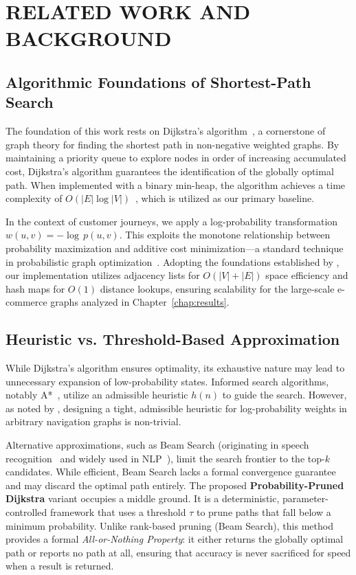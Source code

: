 \chapter{RELATED WORK AND BACKGROUND}

\section{Algorithmic Foundations of Shortest-Path Search}

The foundation of this work rests on Dijkstra's algorithm~\citep{dijkstra1959}, a cornerstone of graph theory for finding the shortest path in non-negative weighted graphs. By maintaining a priority queue to explore nodes in order of increasing accumulated cost, Dijkstra's algorithm guarantees the identification of the globally optimal path. When implemented with a binary min-heap, the algorithm achieves a time complexity of $O(|E|\log|V|)$~\citep{cormen2009}, which is utilized as our primary baseline.

In the context of customer journeys, we apply a log-probability transformation $w(u,v) = -\log\,p(u,v)$. This exploits the monotone relationship between probability maximization and additive cost minimization---a standard technique in probabilistic graph optimization~\citep{manning1999nlp}. Adopting the foundations established by \citet{cormen2009}, our implementation utilizes adjacency lists for $O(|V|+|E|)$ space efficiency and hash maps for $O(1)$ distance lookups, ensuring scalability for the large-scale e-commerce graphs analyzed in Chapter~\ref{chap:results}.

\section{Heuristic vs. Threshold-Based Approximation}

While Dijkstra's algorithm ensures optimality, its exhaustive nature may lead to unnecessary expansion of low-probability states. Informed search algorithms, notably A*~\citep{hart1968astar}, utilize an admissible heuristic $h(n)$ to guide the search. However, as noted by \citet{pearl1984heuristics}, designing a tight, admissible heuristic for log-probability weights in arbitrary navigation graphs is non-trivial.

Alternative approximations, such as Beam Search (originating in speech recognition~\citep{lowerre1976speech} and widely used in NLP~\citep{jurafsky2000speech}), limit the search frontier to the top-$k$ candidates. While efficient, Beam Search lacks a formal convergence guarantee and may discard the optimal path entirely. The proposed \textbf{Probability-Pruned Dijkstra} variant occupies a middle ground. It is a deterministic, parameter-controlled framework that uses a threshold $\tau$ to prune paths that fall below a minimum probability. Unlike rank-based pruning (Beam Search), this method provides a formal \emph{All-or-Nothing Property}: it either returns the globally optimal path or reports no path at all, ensuring that accuracy is never sacrificed for speed when a result is returned.

